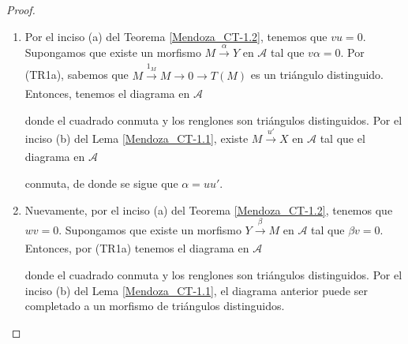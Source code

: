 \documentclass[tesis]{subfiles}
\begin{document}
\begin{proof}\leavevmode

    \begin{enumerate}[label=(\alph*)]
    
        \item Por el inciso (a) del Teorema \ref{Mendoza_CT-1.2}, tenemos que $vu=0$. Supongamos que existe un morfismo $M\xrightarrow[]{\alpha}Y$ en $\mathscr{A}$ tal que $v\alpha=0$. Por (TR1a), sabemos que $M\xrightarrow[]{1_M}M\to 0\to T(M)$ es un triángulo distinguido. Entonces, tenemos el diagrama en $\mathscr{A}$
            \begin{center}
            \end{center}
            donde el cuadrado conmuta y los renglones son triángulos distinguidos. Por el inciso (b) del Lema \ref{Mendoza_CT-1.1}, existe $M\xrightarrow[]{u'}X$ en $\mathscr{A}$ tal que el diagrama en $\mathscr{A}$
            \begin{center}
            \end{center}
            conmuta, de donde se sigue que $\alpha=uu'$.

        \item Nuevamente, por el inciso (a) del Teorema \ref{Mendoza_CT-1.2}, tenemos que $wv=0$. Supongamos que existe un morfismo $Y\xrightarrow[]{\beta}M$ en $\mathscr{A}$ tal que $\beta v=0$. Entonces, por (TR1a) tenemos el diagrama en $\mathscr{A}$
            \begin{center}
            \end{center}
            donde el cuadrado conmuta y los renglones son triángulos distinguidos. Por el inciso (b) del Lema \ref{Mendoza_CT-1.1}, el diagrama anterior puede ser completado a un morfismo de triángulos distinguidos.


\end{enumerate}
\end{proof}
\end{document}
